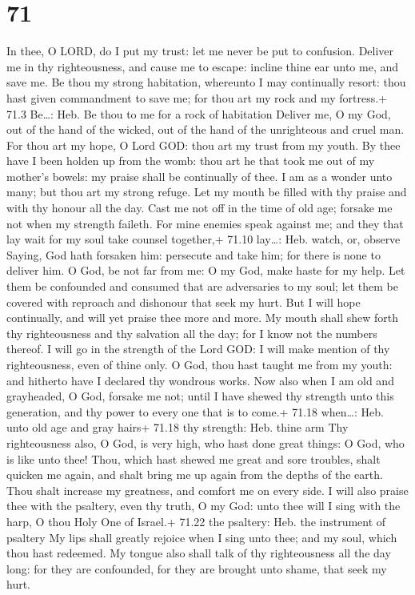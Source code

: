 \hypertarget{section-70}{%
\section{71}\label{section-70}}

 In thee, O LORD, do I put my trust: let me never be put to
confusion.  Deliver me in thy righteousness, and cause me to
escape: incline thine ear unto me, and save me.  Be thou my
strong habitation, whereunto I may continually resort: thou hast given
commandment to save me; for thou art my rock and my fortress.+ 71.3
Be\ldots: Heb. Be thou to me for a rock of habitation 
Deliver me, O my God, out of the hand of the wicked, out of the hand of
the unrighteous and cruel man.  For thou art my hope, O Lord
GOD: thou art my trust from my youth.  By thee have I been
holden up from the womb: thou art he that took me out of my mother's
bowels: my praise shall be continually of thee.  I am as a
wonder unto many; but thou art my strong refuge.  Let my
mouth be filled with thy praise and with thy honour all the day.
 Cast me not off in the time of old age; forsake me not when
my strength faileth.  For mine enemies speak against me;
and they that lay wait for my soul take counsel together,+ 71.10
lay\ldots: Heb. watch, or, observe  Saying, God hath
forsaken him: persecute and take him; for there is none to deliver him.
 O God, be not far from me: O my God, make haste for my
help.  Let them be confounded and consumed that are
adversaries to my soul; let them be covered with reproach and dishonour
that seek my hurt.  But I will hope continually, and will
yet praise thee more and more.  My mouth shall shew forth
thy righteousness and thy salvation all the day; for I know not the
numbers thereof.  I will go in the strength of the Lord
GOD: I will make mention of thy righteousness, even of thine only.
 O God, thou hast taught me from my youth: and hitherto
have I declared thy wondrous works.  Now also when I am old
and grayheaded, O God, forsake me not; until I have shewed thy strength
unto this generation, and thy power to every one that is to come.+ 71.18
when\ldots: Heb. unto old age and gray hairs+ 71.18 thy strength: Heb.
thine arm  Thy righteousness also, O God, is very high, who
hast done great things: O God, who is like unto thee! 
Thou, which hast shewed me great and sore troubles, shalt quicken me
again, and shalt bring me up again from the depths of the earth.
 Thou shalt increase my greatness, and comfort me on every
side.  I will also praise thee with the psaltery, even thy
truth, O my God: unto thee will I sing with the harp, O thou Holy One of
Israel.+ 71.22 the psaltery: Heb. the instrument of psaltery
 My lips shall greatly rejoice when I sing unto thee; and
my soul, which thou hast redeemed.  My tongue also shall
talk of thy righteousness all the day long: for they are confounded, for
they are brought unto shame, that seek my hurt.

